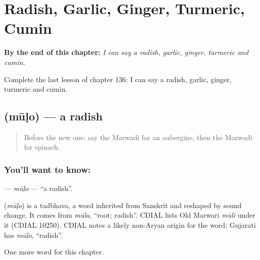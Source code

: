 
\chapter{Radish, Garlic, Ginger, Turmeric, Cumin}
\label{ch:mw-radish-garlic-ginger-turmeric-cumin}

\begin{chapteropening}
\textbf{By the end of this chapter:} \emph{I can say a radish, garlic, ginger, turmeric and cumin.}

Complete the last lesson of chapter 136: I can say a radish, garlic, ginger, turmeric and cumin.
\end{chapteropening}

\section[\texorpdfstring{\mw{मूळो} (mūḷo)}{मूळो (mūḷo)}]{ (mūḷo) — a radish}

\label{lesson:MW-C136-mulo}



\begin{quote}
Before the new one: say the Marwadi for an aubergine, then the Marwadi for spinach.
\end{quote}

\subsection*{You'll want to know: }
\textbf{} — \emph{mūḷo} — \textquotedblleft{}a radish\textquotedblright{}.

\begin{cousinweb}
\textbf{} (\emph{mūḷo}) is a tadbhava, a word inherited from Sanskrit and reshaped by sound change. It comes from \emph{mūla}, \textquotedblleft{}root; radish\textquotedblright{}. CDIAL lists Old Marwari \emph{mūlī} under it (CDIAL 10250). CDIAL notes a likely non-Aryan origin for the word; Gujarati has \emph{mūḷo}, \textquotedblleft{}radish\textquotedblright{}.
\end{cousinweb}

\begin{grammarlens}[title={What you've built}]
One more word for this chapter.
\end{grammarlens}

